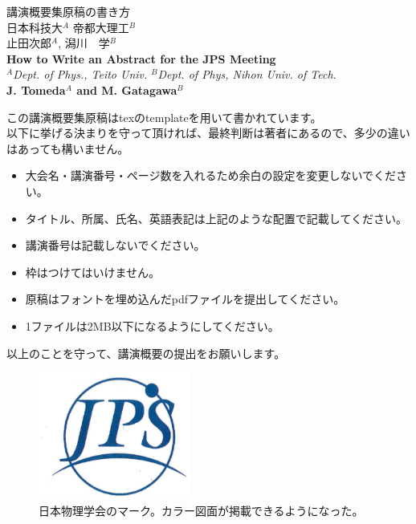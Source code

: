 \documentclass[12pt,a4paper,upLaTeX]{jsarticle}
\begin{document}
\vspace{-5pt}
\begin{center}
{\gt \Large 講演概要集原稿の書き方 }\\[14pt]

{\gt \large 日本科技大$^A$ 帝都大理工$^B$ \\ 止田次郎$^A$, 潟川　学$^B$}\\[5pt]

{\large \bf How to Write an Abstract for the JPS Meeting}\\[5pt]

{\large \it $^A$Dept. of Phys., Teito Univ. $^B$Dept. of Phys, Nihon Univ. of Tech.}\\

{\large \bf J. Tomeda$^A$ and M. Gatagawa$^B$}
\end{center}

\vspace{10pt}

この講演概要集原稿はtexのtemplateを用いて書かれています。\\
以下に挙げる決まりを守って頂ければ、最終判断は著者にあるので、多少の違いはあっても構いません。

\begin{itemize}
\item 大会名・講演番号・ページ数を入れるため余白の設定を変更しないでください。
\item タイトル、所属、氏名、英語表記は上記のような配置で記載してください。
\item 講演番号は記載しないでください。
\item 枠はつけてはいけません。
\item 原稿はフォントを埋め込んだpdfファイルを提出してください。
\item 1ファイルは2MB以下になるようにしてください。
\end{itemize}

以上のことを守って、講演概要の提出をお願いします。


\begin{figure}[h]
\begin{center}
\includegraphics[width=5cm]{JPS.eps}
\end{center}
\caption{日本物理学会のマーク。カラー図面が掲載できるようになった。 }
\end{figure}
\end{document}
